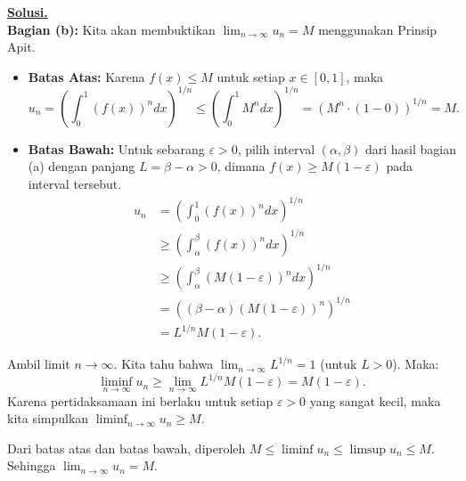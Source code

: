 \documentclass[12pt,twoside]{article}
\newenvironment{solution}
{
	\par\noindent\textbf{\underline{Solusi.}}\\
}
{
	\par
}
\begin{document}
\begin{enumerate}
\begin{solution}
          \textbf{Bagian (b):}
          Kita akan membuktikan $\lim_{n \to \infty} u_n = M$ menggunakan Prinsip Apit.
          \begin{itemize}
            \item \textbf{Batas Atas:}
                  Karena $f(x) \le M$ untuk setiap $x \in [0,1]$, maka
                  \[ u_n = \left( \int_0^1 (f(x))^n dx \right)^{1/n} \le \left( \int_0^1 M^n dx \right)^{1/n} = (M^n \cdot (1-0))^{1/n} = M. \]

            \item \textbf{Batas Bawah:}
                  Untuk sebarang $\varepsilon > 0$, pilih interval $(\alpha, \beta)$ dari hasil bagian (a) dengan panjang $L = \beta - \alpha > 0$, dimana $f(x) \ge M(1-\varepsilon)$ pada interval tersebut.
                  \begin{align*}
                    u_n & = \left( \int_0^1 (f(x))^n dx \right)^{1/n}                        \\
                        & \ge \left( \int_\alpha^\beta (f(x))^n dx \right)^{1/n}             \\
                        & \ge \left( \int_\alpha^\beta (M(1-\varepsilon))^n dx \right)^{1/n} \\
                        & = ((\beta-\alpha)(M(1-\varepsilon))^n)^{1/n}                       \\
                        & = L^{1/n} M(1-\varepsilon).
                  \end{align*}
          \end{itemize}
          Ambil limit $n \to \infty$. Kita tahu bahwa $\lim_{n \to \infty} L^{1/n} = 1$ (untuk $L > 0$).
          Maka:
          \[ \liminf_{n \to \infty} u_n \ge \lim_{n \to \infty} L^{1/n} M(1-\varepsilon) = M(1-\varepsilon). \]
          Karena pertidaksamaan ini berlaku untuk setiap $\varepsilon > 0$ yang sangat kecil, maka kita simpulkan $\liminf_{n \to \infty} u_n \ge M$.

          Dari batas atas dan batas bawah, diperoleh $M \le \liminf u_n \le \limsup u_n \le M$.
          Sehingga $\lim_{n \to \infty} u_n = M$.
        \end{solution}


\end{enumerate}
\end{document}
